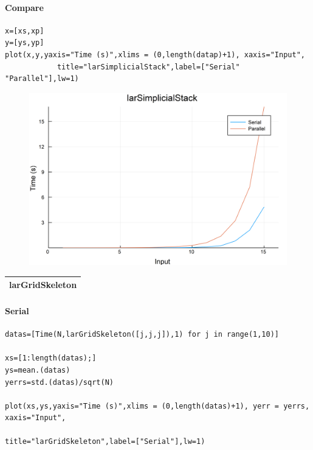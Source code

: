 \documentclass{article}
\begin{document}
\paragraph{Compare}
\begin{flushleft}\small
\begin{list}{}{} \item
    \begin{Verbatim}[tabsize=4]
x=[xs,xp]
y=[ys,yp]
plot(x,y,yaxis="Time (s)",xlims = (0,length(datap)+1), xaxis="Input",
            title="larSimplicialStack",label=["Serial" "Parallel"],lw=1)
    \end{Verbatim}
\end{list}
\end{flushleft}   
\begin{figure}[h!]
\centering
\includegraphics[scale=0.06]{larSimplicialStackCom.png}
\end{figure}
\newpage
\begin{tabular}{p{16cm}}
\hline
larGridSkeleton\\
\hline
\end{tabular}

\paragraph{Serial}
\begin{flushleft}\small
\begin{list}{}{} \item
    \begin{Verbatim}[tabsize=4]
datas=[Time(N,larGridSkeleton([j,j,j]),1) for j in range(1,10)]

xs=[1:length(datas);]
ys=mean.(datas)
yerrs=std.(datas)/sqrt(N)

plot(xs,ys,yaxis="Time (s)",xlims = (0,length(datas)+1), yerr = yerrs, xaxis="Input", 
                                            title="larGridSkeleton",label=["Serial"],lw=1)
    \end{Verbatim}
\end{list}
\end{flushleft}  
\end{document}
